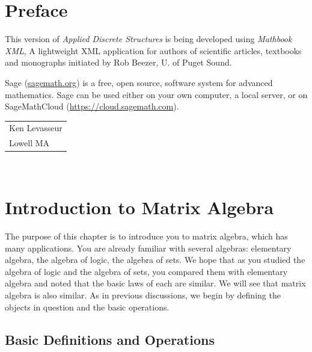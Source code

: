 \documentclass[10pt,]{book}
\theoremstyle{plain}
\theoremstyle{definition}
\theoremstyle{definition}
\theoremstyle{definition}
\theoremstyle{definition}
\begin{document}
\chapter*{Preface}\label{preface-1}
This version of \emph{Applied Discrete Structures} is being developed using \emph{Mathbook XML}, A lightweight XML application for authors of scientific articles, textbooks and monographs initiated by Rob Beezer, U. of Puget Sound.  %
\par
Sage (\href{http://sagemath.org}{sagemath.org}) is a free, open source, software system for advanced mathematics.  Sage can be used either on your own computer, a local server, or on SageMathCloud (\href{https://cloud.sagemath.com}{https://cloud.sagemath.com}). %
\par\hfill\begin{tabular}{l@{}}
Ken Levasseur\\
Lowell MA
\end{tabular}\\\par
\setcounter{tocdepth}{1}
\renewcommand*\contentsname{Contents}
\tableofcontents
\mainmatter
\typeout{************************************************}
\typeout{************************************************}
\chapter[Introduction to Matrix Algebra]{Introduction to Matrix Algebra}\label{c-chapter_5}
\typeout{************************************************}
\typeout{************************************************}
The purpose of this chapter is to introduce you to matrix algebra, which has many applications. You are already familiar with several algebras: elementary algebra, the algebra of logic, the algebra of sets. We hope that as you studied the algebra of logic and the algebra of sets, you compared them with elementary algebra and noted that the basic laws of each are similar. We will see that matrix algebra is also similar. As in previous discussions, we begin by defining the objects in question and the basic operations.%
\typeout{************************************************}
\typeout{************************************************}
\section[Basic Definitions and Operations]{Basic Definitions and Operations}\label{s-basic-matrix-definitions}
\typeout{************************************************}
\typeout{************************************************}
\end{document}
